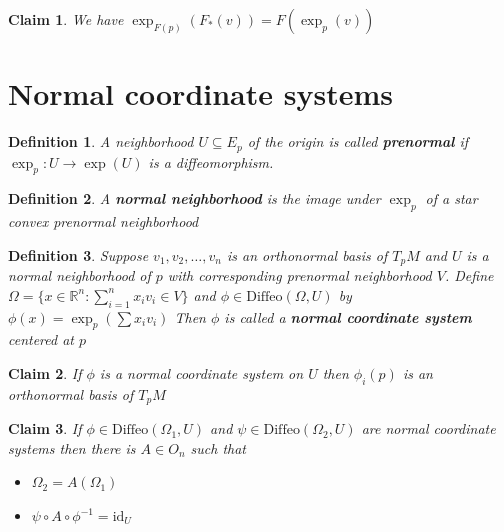 \documentclass{article}
\newtheorem{definition}{Definition}
\newtheorem{claim}{Claim}
\begin{document}
\begin{claim}
  We have $\exp_{F(p)}(F_*(v))=F(\exp_p(v))$
\end{claim}

\section{Normal coordinate systems}

\begin{definition}
  A neighborhood $U \subseteq E_p$ of the origin is called \textbf{prenormal} if $\exp_p:U \to \exp(U)$ is a diffeomorphism.
\end{definition}

\begin{definition}
  A \textbf{normal neighborhood} is the image under $\exp_p$ of a star convex prenormal neighborhood
\end{definition}

\begin{definition}
  Suppose $v_1,v_2,\dots,v_n$ is an orthonormal basis of $T_pM$ and $U$ is a normal neighborhood of $p$ with corresponding prenormal neighborhood $V$. 
  Define $\Omega=\{x \in \mathbb{R}^n : \sum_{i=1}^n x_iv_i \in V\}$ and $\phi \in \text{Diffeo}(\Omega,U)$ by $\phi(x)=\exp_p(\sum x_iv_i)$
  Then $\phi$ is called a \textbf{normal coordinate system} centered at $p$
\end{definition}

\begin{claim}
  If $\phi$ is a normal coordinate system on $U$ then $\phi_i(p)$ is an orthonormal basis of $T_pM$
\end{claim}

\begin{claim}
  If $\phi \in \text{Diffeo}(\Omega_1,U)$ and $\psi \in \text{Diffeo}(\Omega_2,U)$ are normal coordinate systems then there is $A \in O_n$ such that 
  \begin{itemize}
    \item $\Omega_2=A(\Omega_1)$
    \item $\psi \circ A \circ \phi^{-1}=\text{id}_U$
  \end{itemize}
  
\end{claim}
\end{document}
